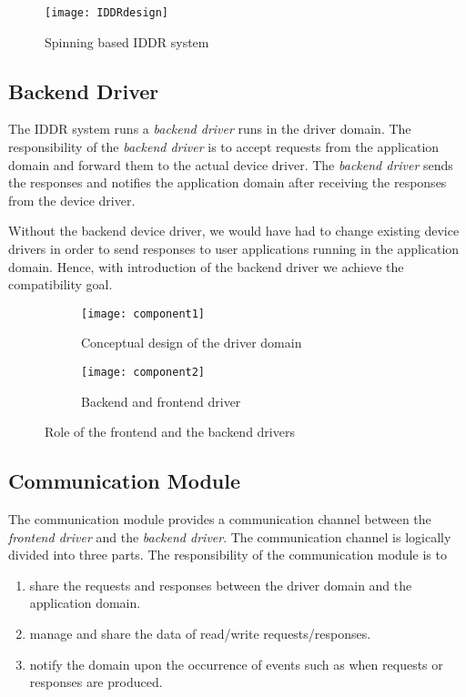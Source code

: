 \begin{figure}[!ht]
\centering
\texttt{[image: IDDRdesign]}
\caption{Spinning based IDDR system}
\label{fig:new IDDR system}
\end{figure}
\subsection{Backend Driver}
\label{subsec:backend}
The IDDR system runs a \textit{backend driver}
runs in the driver domain. The responsibility of the \textit{backend
driver} is to accept requests from the application domain and forward
them to the actual device driver. The \textit{backend driver} sends
the responses and notifies the application domain after receiving the
responses from the device driver.

Without the backend device driver, we would have had to change existing device
drivers in order to send responses to user applications running in the
application domain. Hence, with introduction of the backend driver we
achieve the compatibility goal.

\begin{figure}[!ht]
    \centering
    \begin{subfigure}[b]{0.45\textwidth}
	\texttt{[image: component1]}
	\caption{Conceptual design of the driver domain}
	\label{fig:conept}
    \end{subfigure}
	\hfill
    \begin{subfigure}[b]{0.45\textwidth}
	\texttt{[image: component2]}
	\caption{Backend and frontend driver}
	\label{fig:backendfrontend}
    \end{subfigure}
    \caption{Role of the frontend and the backend drivers}\label{fig:fault tolerence}
\end{figure}

\subsection{Communication Module}
\label{sub:communicationmodule}

The communication module provides a communication channel between
the \textit{frontend driver} and the \textit{backend driver}. The
communication channel is logically divided into three parts. The
responsibility of the communication module is to

\begin{enumerate} 
\item share the requests and responses between the driver domain and the application domain.
\item manage and share the data of read/write requests/responses.
\item notify the domain upon the occurrence of events such as when requests or responses are produced. 
\end{enumerate}

